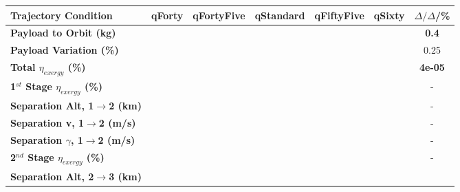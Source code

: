\begin{table}[ht]
\centering
\begin{tabular}{l c c c c c c} 
	\hline \textbf{Trajectory Condition}
	&qForty
	&qFortyFive
	&qStandard
	&qFiftyFive
	&qSixty
	& $\Delta/\Delta$/\%
	\\
	\hline \textbf{Payload to Orbit (kg)}
	& \textbf{\PayloadToOrbitqForty}
	& \textbf{\PayloadToOrbitqFortyFive}
	& \textbf{\PayloadToOrbitqStandard}
	& \textbf{\PayloadToOrbitqFiftyFive}
	& \textbf{\PayloadToOrbitqSixty}
	&\textbf{0.4}
	\\
	\textbf{Payload Variation (\%)}
	& \PayloadVarqForty
	& \PayloadVarqFortyFive
	& \PayloadVarqStandard
	& \PayloadVarqFiftyFive
	& \PayloadVarqSixty
	&0.25
	\\
	\textbf{Total $\eta_{exergy}$ (\%)}
	& \textbf{\totalExergyEffqForty}
	& \textbf{\totalExergyEffqFortyFive}
	& \textbf{\totalExergyEffqStandard}
	& \textbf{\totalExergyEffqFiftyFive}
	& \textbf{\totalExergyEffqSixty}
	& \textbf{4e-05}
	\\
	\hline 
	\textbf{1$^{st}$ Stage $\eta_{exergy}$ (\%)}
	& \textbf{\firstExergyEffqForty}
	& \textbf{\firstExergyEffqFortyFive}
	& \textbf{\firstExergyEffqStandard}
	& \textbf{\firstExergyEffqFiftyFive}
	& \textbf{\firstExergyEffqSixty}
	& -
	\\
	\textbf{Separation Alt, 1$\rightarrow$2 (km)}
	& \firstsecondSeparationAltqForty
	& \firstsecondSeparationAltqFortyFive
	& \firstsecondSeparationAltqStandard
	& \firstsecondSeparationAltqFiftyFive
	& \firstsecondSeparationAltqSixty
	& -
	\\
	\textbf{Separation v, 1$\rightarrow$2 (m/s)}
	& \firstsecondSeparationvqForty
	& \firstsecondSeparationvqFortyFive
	& \firstsecondSeparationvqStandard
	& \firstsecondSeparationvqFiftyFive
	& \firstsecondSeparationvqSixty
	& -
	\\
	\textbf{Separation $\gamma$, 1$\rightarrow$2 (m/s)}
	& \firstsecondSeparationgammaqForty
	& \firstsecondSeparationgammaqFortyFive
	& \firstsecondSeparationgammaqStandard
	& \firstsecondSeparationgammaqFiftyFive
	& \firstsecondSeparationgammaqSixty
	& -
	\\
	\hline 
	\textbf{2$^{nd}$ Stage $\eta_{exergy}$ (\%)}
	& \textbf{\secondExergyEffqForty}
	& \textbf{\secondExergyEffqFortyFive}
	& \textbf{\secondExergyEffqStandard}
	& \textbf{\secondExergyEffqFiftyFive}
	& \textbf{\secondExergyEffqSixty}
	& -
	\\
	\textbf{Separation Alt, 2$\rightarrow$3 (km)}
	& \secondthirdSeparationAltqForty
	& \secondthirdSeparationAltqFortyFive

\end{tabular}
\end{table}
